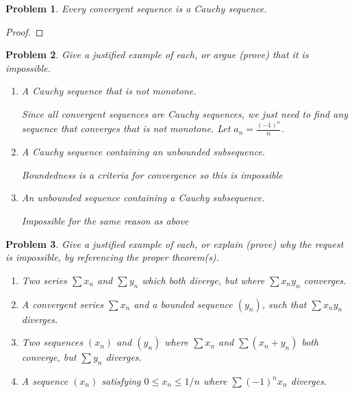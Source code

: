 \documentclass[12pt]{article}
\newtheorem{problem}{Problem}
\begin{document}
\begin{problem} %
Every convergent sequence is a Cauchy sequence.
\end{problem}


\begin{proof}
\end{proof}


\begin{problem} %
Give a justified example of each, or argue (prove) that it is impossible.

\renewcommand{\labelenumi}{(\alph{enumi})}
\begin{enumerate}
\item A Cauchy sequence that is not monotone.

Since all convergent sequences are Cauchy sequences, we just need to find any sequence that converges that is not monotone.
Let $a_n = \frac{(-1)^n}{n}$. 

\item A Cauchy sequence containing an unbounded subsequence.

Boundedness is a criteria for convergence so this is impossible

\item An unbounded sequence containing a Cauchy subsequence.

Impossible for the same reason as above

\end{enumerate}
\end{problem}


\begin{problem} %
Give a justified example of each, or explain (prove) why the request is impossible, by referencing the proper theorem(s).

\renewcommand{\labelenumi}{(\alph{enumi})}
\begin{enumerate}
\item Two series $\sum x_n$ and $\sum y_n$ which both diverge, but where $\sum x_n y_n$ converges.


\item A convergent series $\sum x_n$ and a bounded sequence $(y_n)$, such that $\sum x_n y_n$ diverges.


\item Two sequences $(x_n)$ and $(y_n)$ where $\sum x_n$ and $\sum (x_n+y_n)$ both converge, but $\sum y_n$ diverges.


\item A sequence $(x_n)$ satisfying $0\le x_n \le 1/n$ where $\sum (-1)^n x_n$ diverges.


\end{enumerate}
\end{problem}
\end{document}
